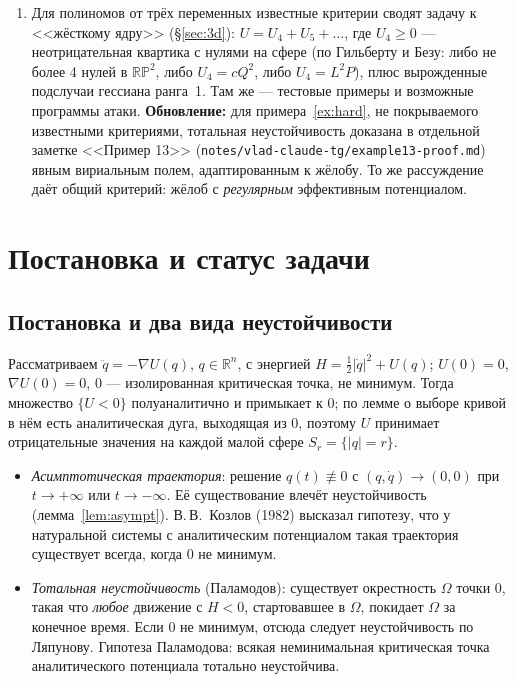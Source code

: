 \documentclass[11pt,a4paper]{article}
\theoremstyle{definition}
\newcommand{\R}{\mathbb R}
\begin{document}
\begin{enumerate}[leftmargin=*]
(iii) в подходе через асимптотические решения на плоскости множество <<кандидатов в асимптотические
направления>> конечно, а поперечная динамика одномерна; в $\R^3$ появляются \emph{жёлобы}~---
целые кривые вырожденных направлений --- и двумерная поперечная динамика.
\item Для полиномов от трёх переменных известные критерии сводят задачу к <<жёсткому ядру>>
(\S\ref{sec:3d}): $U=U_4+U_5+\dots$, где $U_4\ge0$ --- неотрицательная квартика с нулями на сфере
(по Гильберту и Безу: либо не более 4 нулей в $\mathbb{RP}^2$, либо $U_4=cQ^2$, либо $U_4=L^2P$),
плюс вырожденные подслучаи гессиана ранга~1. Там же --- тестовые примеры и возможные программы атаки.
\textbf{Обновление:} для примера~\ref{ex:hard}, не покрываемого известными критериями, тотальная неустойчивость
доказана в отдельной заметке <<Пример 13>> (\nolinkurl{notes/vlad-claude-tg/example13-proof.md}) явным вириальным полем, адаптированным к жёлобу. То же
рассуждение даёт общий критерий: жёлоб с \emph{регулярным} эффективным потенциалом.
\end{enumerate}

\section{Постановка и статус задачи}\label{sec:status}

\subsection{Постановка и два вида неустойчивости}
Рассматриваем $\ddot q=-\nabla U(q)$, $q\in\R^n$, с энергией $H=\tfrac12|\dot q|^2+U(q)$;
$U(0)=0$, $\nabla U(0)=0$, $0$ --- изолированная критическая точка, не минимум.
Тогда множество $\{U<0\}$ полуаналитично и примыкает к $0$; по лемме о выборе кривой в нём есть
аналитическая дуга, выходящая из $0$, поэтому $U$ принимает отрицательные значения на каждой
малой сфере $S_r=\{|q|=r\}$.

\begin{itemize}[leftmargin=*]
\item \emph{Асимптотическая траектория}: решение $q(t)\not\equiv0$ с $(q,\dot q)\to(0,0)$ при
$t\to+\infty$ или $t\to-\infty$. Её существование влечёт неустойчивость (лемма~\ref{lem:asympt}).
В.\,В.~Козлов (1982) высказал гипотезу, что у натуральной системы с аналитическим потенциалом
такая траектория существует всегда, когда $0$ не минимум.
\item \emph{Тотальная неустойчивость} (Паламодов): существует окрестность $\Omega$ точки $0$, такая что
\emph{любое} движение с $H<0$, стартовавшее в $\Omega$, покидает $\Omega$ за конечное время.
Если $0$ не минимум, отсюда следует неустойчивость по Ляпунову. Гипотеза Паламодова: всякая
неминимальная критическая точка аналитического потенциала тотально неустойчива.
\end{itemize}
\end{document}
